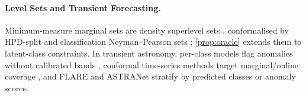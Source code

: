 \paragraph{Level Sets and Transient Forecasting.}
Minimum-measure marginal sets are density superlevel sets \citep{lei2013distribution,lei2014distribution}, conformalised by HPD-split \citep{izbicki2022cd} and classification Neyman--Pearson sets \citep{sadinle2019least}; \cref{prop:oracle} extends them to latent-class constraints.
In transient astronomy, per-class models flag anomalies without calibrated bands \citep{muthukrishna2022real}, conformal time-series methods target marginal/online coverage \citep{stankeviciute2021conformal,gibbs2021adaptive}, and FLARE \citep{sasli2026forecast,sasli2026flare} and ASTRANet \citep{sasli2026astranet} stratify by predicted classes or anomaly scores.
